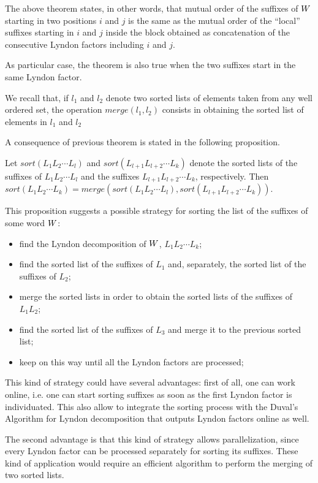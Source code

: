 \documentclass[envcountsame,runningheads]{llncs}
\begin{document}
The above theorem states, in other words, that mutual order of the suffixes of $W$ starting in two positions $i$ and $j$ is the same as the mutual order of the ``local'' suffixes starting in $i$ and $j$ inside the block obtained as concatenation of the consecutive Lyndon factors including $i$ and $j$.



As particular case, the theorem is also true when the two suffixes start in the same Lyndon factor.

We recall that, if $l_1$ and $l_2$ denote two sorted lists of elements taken from any well ordered set, the operation $merge(l_1, l_2)$ consists in obtaining the sorted list of elements in $l_1$ and $l_2$

A consequence of previous theorem is stated in the following proposition.
\begin{proposition}
Let $sort(L_1L_2\cdots L_l)$ and $sort(L_{l+1}L_{l+2}\cdots L_k)$ denote the sorted lists of the suffixes of  $L_1L_2\cdots L_l$ and the suffixes $L_{l+1}L_{l+2}\cdots L_k$, respectively. Then $sort(L_1L_2  \cdots L_k)=merge(sort(L_1L_2\cdots L_l), sort(L_{l+1}L_{l+2}\cdots L_k))$.
\end{proposition}

This proposition suggests a possible strategy for sorting the list of the suffixes of some word $W$:
\begin{itemize}
\item find the Lyndon decomposition of $W$, $L_1L_2 \cdots L_k$;
\item find the sorted list of the suffixes of $L_1$ and, separately, the sorted list of the suffixes of $L_2$;
\item merge the sorted lists in order to obtain the sorted lists of the suffixes of $L_1L_2$;
\item find the sorted list of the suffixes of $L_3$ and  merge it to the previous sorted list;
\item keep on this way until all the Lyndon factors are processed;
\end{itemize}

This kind of strategy could have several advantages: first of all, one can work online, i.e. one can start sorting suffixes as soon as the first Lyndon factor is individuated. This also allow to integrate the sorting process with the Duval's Algorithm for Lyndon decomposition that outputs Lyndon factors online as well.

The second advantage is that this kind of strategy allows parallelization, since every Lyndon factor can be processed separately for sorting its suffixes. These kind of application would require an efficient algorithm to perform the merging of two sorted lists.
\end{document}
